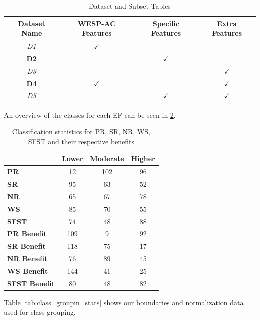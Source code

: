 \documentclass[12pt,letterpaper]{article}
\begin{document}
\begin{table}[h!]
\centering
\begin{tabular}{|c|c|c|c|}
\hline
\textbf{Dataset Name} & \textbf{WESP-AC Features} & \textbf{Specific Features} & \textbf{Extra Features} \\
\hline
\textit{D1} & $\checkmark$ &  &  \\
\hline
\textbf{D2} &  & $\checkmark$ &  \\ 
\hline
\textit{D3} &  & & $\checkmark$\\
\hline
\textbf{D4} &$\checkmark$ &  & $\checkmark$ \\
\hline
\textit{D5} &  & $\checkmark$ & $\checkmark$ \\
\hline
\end{tabular}
\caption{Dataset and Subset Tables}
\label{table:subdatasets}
\end{table}




An overview of the classes for each \ac{EF} can be seen in \ref{tab:classification_statistics}.

\begin{table}[ht]
\centering
\begin{tabular}{lccc}
\hline
& \textbf{Lower} & \textbf{Moderate} & \textbf{Higher} \\
\hline
\textbf{PR}            & 12  & 102 & 96  \\
\textbf{SR}            & 95  & 63  & 52  \\
\textbf{NR}            & 65  & 67  & 78  \\
\textbf{WS}            & 85  & 70  & 55  \\
\textbf{SFST}          & 74  & 48  & 88  \\
\textbf{PR Benefit}   & 109 & 9   & 92  \\
\textbf{SR Benefit}   & 118 & 75  & 17  \\
\textbf{NR Benefit}   & 76  & 89  & 45  \\
\textbf{WS Benefit}   & 144 & 41  & 25  \\
\textbf{SFST Benefit} & 80  & 48  & 82  \\
\hline
\end{tabular}
\caption{Classification statistics for PR, SR, NR, WS, SFST and their respective benefits}
\label{tab:classification_statistics}
\end{table}



Table \ref{tab:class_groupin_stats} shows our boundaries and normalization data used for class grouping.
\end{document}
